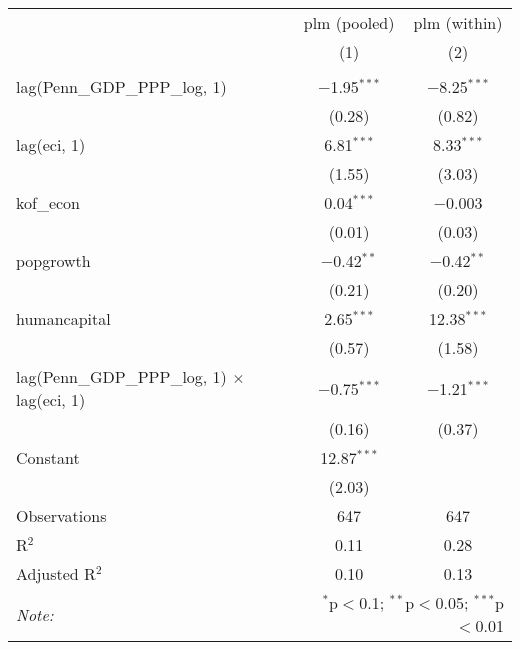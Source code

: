 
\begin{tabular}{@{\hspace{5pt}}l@{\hspace{5pt}}cc} 
\toprule 
 & plm (pooled) & plm (within) \\ 
 & (1) & (2)\\ 
\midrule  
\\[-2.1ex] lag(Penn\_GDP\_PPP\_log, 1) & $-$1.95$^{***}$ & $-$8.25$^{***}$ \\ 
  & (0.28) & (0.82) \\ 
 \addlinespace 
 lag(eci, 1) & 6.81$^{***}$ & 8.33$^{***}$ \\ 
  & (1.55) & (3.03) \\ 
 \addlinespace 
 kof\_econ & 0.04$^{***}$ & $-$0.003 \\ 
  & (0.01) & (0.03) \\ 
 \addlinespace 
 popgrowth & $-$0.42$^{**}$ & $-$0.42$^{**}$ \\ 
  & (0.21) & (0.20) \\ 
 \addlinespace 
 humancapital & 2.65$^{***}$ & 12.38$^{***}$ \\ 
  & (0.57) & (1.58) \\ 
 \addlinespace 
 lag(Penn\_GDP\_PPP\_log, 1) $\times$ lag(eci, 1) & $-$0.75$^{***}$ & $-$1.21$^{***}$ \\ 
  & (0.16) & (0.37) \\ 
 \addlinespace 
 Constant & 12.87$^{***}$ &  \\ 
  & (2.03) &  \\ 
 \addlinespace 
\midrule  
Observations & 647 & 647 \\ 
R$^{2}$ & 0.11 & 0.28 \\ 
Adjusted R$^{2}$ & 0.10 & 0.13 \\ 
\bottomrule 
\textit{Note:}  & \multicolumn{2}{r}{$^{*}$p$<$0.1; $^{**}$p$<$0.05; $^{***}$p$<$0.01} \\ 
\end{tabular} 
